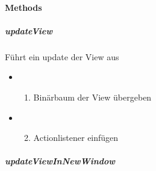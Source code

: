 \documentclass[letterpaper,10pt,ngerman]{sphinxmanual}
\begin{document}
\paragraph{Methods}
\label{\detokenize{com/linuxluigi/edu/Controller:methods}}

\subparagraph{updateView}
\label{\detokenize{com/linuxluigi/edu/Controller:updateview}}

\begin{fulllineitems}
\label{\detokenize{com/linuxluigi/edu/Controller:com.linuxluigi.edu.Controller.updateView()}}
Führt ein update der View aus
\begin{itemize}
\item {} \begin{enumerate}
\item {} 
Binärbaum der View übergeben

\end{enumerate}

\item {} \begin{enumerate}
\setcounter{enumi}{1}
\item {} 
Actionlistener einfügen

\end{enumerate}

\end{itemize}

\end{fulllineitems}



\subparagraph{updateViewInNewWindow}
\label{\detokenize{com/linuxluigi/edu/Controller:updateviewinnewwindow}}
\end{document}

